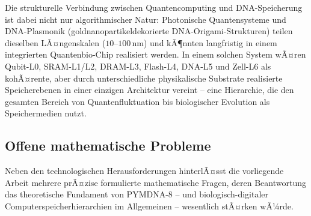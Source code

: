 ﻿\documentclass[a4paper,12pt]{article}
\theoremstyle{definition}
\begin{document}
Die strukturelle Verbindung zwischen Quantencomputing und DNA-Speicherung ist dabei nicht nur algorithmischer Natur: Photonische Quantensysteme und DNA-Plasmonik (goldnanopartikeldekorierte DNA-Origami-Strukturen) teilen dieselben LÃ¤ngenskalen ($10$--$100$\,nm) und kÃ¶nnten langfristig in einem integrierten Quantenbio-Chip realisiert werden. In einem solchen System wÃ¤ren Qubit-L0, SRAM-L1/L2, DRAM-L3, Flash-L4, DNA-L5 und Zell-L6 als kohÃ¤rente, aber durch unterschiedliche physikalische Substrate realisierte Speicherebenen in einer einzigen Architektur vereint -- eine Hierarchie, die den gesamten Bereich von Quantenfluktuation bis biologischer Evolution als Speichermedien nutzt.

\subsection{Offene mathematische Probleme}

Neben den technologischen Herausforderungen hinterlÃ¤sst die vorliegende Arbeit mehrere prÃ¤zise formulierte mathematische Fragen, deren Beantwortung das theoretische Fundament von PYMDNA-8 -- und biologisch-digitaler Computerspeicherhierarchien im Allgemeinen -- wesentlich stÃ¤rken wÃ¼rde.
\end{document}
